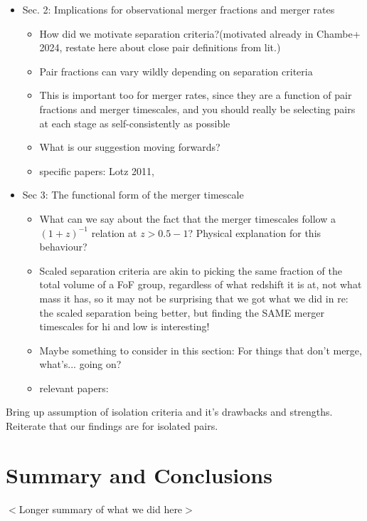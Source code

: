 \documentclass[twocolumn,linenumbers]{aastex631}
\begin{document}
\begin{itemize}
        \item Sec. 2: Implications for observational merger fractions and merger rates
        \begin{itemize}
            \item How did we motivate separation criteria?(motivated already in Chambe+ 2024, restate here about close pair definitions from lit.)
            \item Pair fractions can vary wildly depending on separation criteria
            \item This is important too for merger rates, since they are a function of pair fractions and merger timescales, and you should really be selecting pairs at each stage as self-consistently as possible
            \item What is our suggestion moving forwards?
            \item specific papers: Lotz 2011, 
        \end{itemize}
        \item Sec 3: The functional form of the merger timescale
        \begin{itemize}
            \item What can we say about the fact that the merger timescales follow a $(1+z)^{-1}$ relation at $z>0.5-1$? Physical explanation for this behaviour? 
            \item Scaled separation criteria are akin to picking the same fraction of the total volume of a FoF group, regardless of what redshift it is at, not what mass it has, so it may not be surprising that we got what we did in re: the scaled separation being better, but finding the SAME merger timescales for hi and low is interesting!
            \item Maybe something to consider in this section: For things that don't merge, what's... going on? 
            \item relevant papers: 
        \end{itemize}
    \end{itemize}
    
    Bring up assumption of isolation criteria and it's drawbacks and strengths.
    Reiterate that our findings are for isolated pairs. 
    
    
    
\section{Summary and Conclusions}
    $<$Longer summary of what we did here$>$
    
\end{document}
